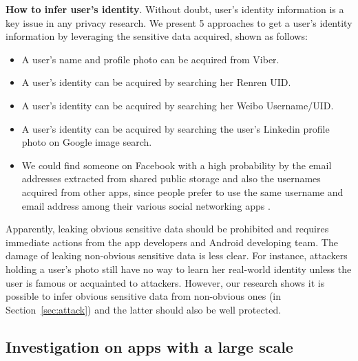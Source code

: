 \documentclass{sig-alternate}
\begin{document}
\noindent\textbf{How to infer user's identity}. Without doubt, user's identity information is a key issue in any privacy research. We present 5 approaches to get a user's identity information by leveraging the sensitive data acquired, shown as follows:

\begin{itemize}

 \item A user's name and profile photo can be acquired from Viber.

 \item A user's identity can be acquired by searching her Renren UID.

 \item A user's identity can be acquired by searching her Weibo Username/UID.

 \item A user's identity can be acquired by searching the user's Linkedin profile photo on Google image search.

 \item We could find someone on Facebook with a high probability by the email addresses extracted from shared public storage and also the usernames acquired from other apps, since people prefer to use the same username and email address among their various social networking apps \cite{sameusername}.
\end{itemize}


Apparently, leaking obvious sensitive data should be prohibited and requires immediate actions from the app developers and Android developing team. The damage of leaking non-obvious sensitive data is less clear. For instance, attackers holding a user's photo still have no way to learn her real-world identity unless the user is famous or acquainted to attackers. However, our research shows it is possible to infer obvious sensitive data from non-obvious ones (in Section~\ref{sec:attack}) and the latter should also be well protected.










\subsection{Investigation on apps with a large scale}
\label{investigationlargescale}
\end{document}
